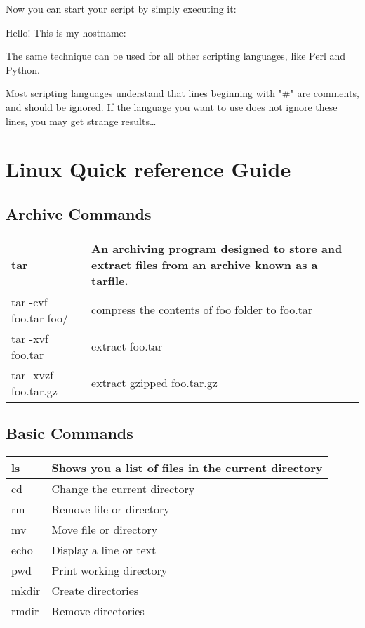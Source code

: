 Now you can start your script by simply executing it:

\begin{prompt}
Hello! This is my hostname:
\end{prompt}

The same technique can be used for all other scripting languages, like Perl and Python.

Most scripting languages understand that lines beginning with "\#" are
comments, and should be ignored. If the language you want to use does not
ignore these lines, you may get strange results\ldots

\section{Linux Quick reference Guide}

\subsection{Archive Commands}

\begin{tabular}{|p{}|p{}|} \hline
tar                   & An archiving program designed to store and extract files from an archive known as a tarfile.  \\ \hline
tar -cvf foo.tar foo/ & compress the contents of foo folder to foo.tar \\ \hline
tar -xvf foo.tar      & extract foo.tar \\ \hline
tar -xvzf foo.tar.gz  & extract gzipped foo.tar.gz \\ \hline
\end{tabular}


\subsection{Basic Commands}

\begin{tabular}{|p{}|p{}|} \hline
ls     & Shows you a list of files in the current directory \\ \hline
cd     & Change the current directory \\ \hline
rm     & Remove file or directory \\ \hline
mv     & Move file or directory \\ \hline
echo   & Display a line or text \\ \hline
pwd    & Print working directory \\ \hline
mkdir  & Create directories \\ \hline
rmdir  & Remove directories \\ \hline
\end{tabular}



